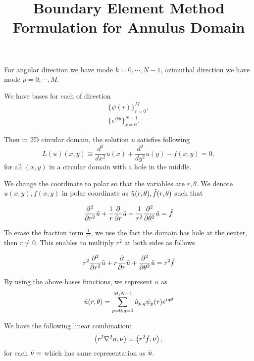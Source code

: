 \documentclass[11pt,letterpaper]{article}
\begin{document}
\title{{\bfseries Boundary Element Method Formulation for Annulus Domain}
}
For angular direction we have mode $k = 0, \cdots, N-1$, azimuthal
direction we have mode $p = 0, \cdots, M$.

We have bases for each of direction
\begin{align}
\{\psi(r) \}_{r=0}^M,\\
\{e^{ik\theta}\}_{k=0}^{N-1}.
\end{align}

Then in 2D circular domain, the solution $u$ satisfies following
\begin{equation}
L(u)(x,y) \equiv \frac{d^2}{dx^2} u(x) + \frac{d^2}{dy^2} u(y)-
f(x,y) = 0,
\end{equation}
for all $(x,y)$ in a circular domain with a hole in the middle.


We change the coordinate to polar so that the variables are $r,
\theta$. We denote $u(x, y), f(x, y)$ in polar coordinate as
$\Tilde{u}(r, \theta), \Tilde{f}(r, \theta)$ such that

\begin{equation}
\frac{\partial^2}{\partial r^2} \Tilde{u} +
\frac{1}{r}\frac{\partial}{\partial r} \Tilde{u} +
\frac{1}{r^2}\frac{\partial^2}{\partial \theta^2} \Tilde{u} =
\Tilde{f}
\end{equation}

To erase the fraction term $\frac{1}{r^2}$, we use the fact the
domain has hole at the center, then $r \ne 0$. This enables to
multiply $r^2$ at both sides as follows

\begin{equation}
r^2 \frac{\partial^2}{\partial r^2} \Tilde{u} + r
\frac{\partial}{\partial r} \Tilde{u} + \frac{\partial^2}{\partial
\theta^2} \Tilde{u} = r^2 \Tilde{f}
\end{equation}

 By using the above bases functions, we represent $u$ as
\begin{align}
\Tilde{u}(r, \theta) =
\sum_{p=0,q=0}^{M,N-1}\Hat{u}_{p,q}\psi_p(r) e^{iq\theta} \\
\end{align}

We have the following linear combination:
\begin{equation}
\left(r^2 \nabla^2 \Tilde{u}, \Tilde{\nu} \right) =
\left(r^2 \Tilde{f}, \Tilde{\nu}\right),
\end{equation}
for each $\Tilde{\nu} = $ which has same representation as
$\Tilde{u}$.
\end{document}
